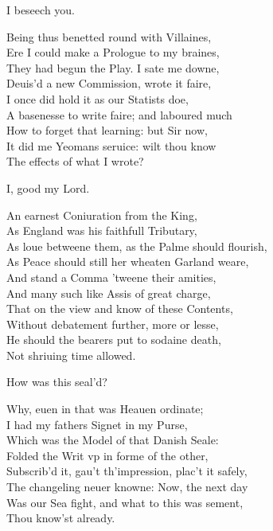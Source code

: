\documentclass[a5paper,DIV=calc,11pt]{scrbook}
\begin{document}
\begin{drama*}
    \horspeaks I beseech you.
    
    \hamspeaks Being thus benetted round with Villaines,\\
    Ere I could make a Prologue to my braines,\\
    They had begun the Play. I sate me downe,\\
    Deuis'd a new Commission, wrote it faire,\\
    I once did hold it as our Statists doe,\\
    A basenesse to write faire; and laboured much\\
    How to forget that learning: but Sir now,\\
    It did me Yeomans seruice: wilt thou know\\
    The effects of what I wrote?
    
    \horspeaks I, good my Lord.
    
    \hamspeaks An earnest Coniuration from the King,\\
    As England was his faithfull Tributary,\\
    As loue betweene them, as the Palme should flourish,\\
    As Peace should still her wheaten Garland weare,\\
    And stand a Comma 'tweene their amities,\\
    And many such like Assis of great charge,\\
    That on the view and know of these Contents,\\
    Without debatement further, more or lesse,\\
    He should the bearers put to sodaine death,\\
    Not shriuing time allowed.
    
    \horspeaks How was this seal'd?
    
    \hamspeaks Why, euen in that was Heauen ordinate;\\
    I had my fathers Signet in my Purse,\\
    Which was the Model of that Danish Seale:\\
    Folded the Writ vp in forme of the other,\\
    Subscrib'd it, gau't th'impression, plac't it safely,\\
    The changeling neuer knowne: Now, the next day\\
    Was our Sea fight, and what to this was sement,\\
    Thou know'st already.
    

\end{drama*}
\end{document}
